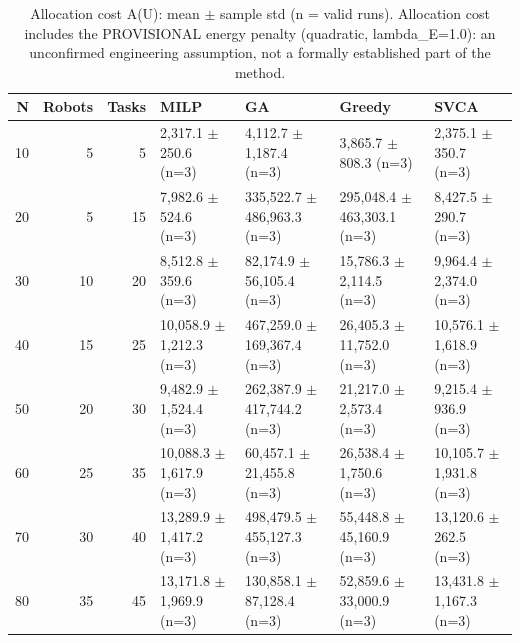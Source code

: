 \begin{table}[htbp]
\centering
\small
\caption{Allocation cost A(U): mean $\pm$ sample std (n = valid runs). Allocation cost includes the PROVISIONAL energy penalty (quadratic, lambda\_E=1.0): an unconfirmed engineering assumption, not a formally established part of the method.}
\label{tab:sample_demo_allocation_cost}
\begin{tabular}{rrrllll}
\hline
N & Robots & Tasks & MILP & GA & Greedy & SVCA \\
\hline
10 & 5 & 5 & 2,317.1 $\pm$ 250.6 (n=3) & 4,112.7 $\pm$ 1,187.4 (n=3) & 3,865.7 $\pm$ 808.3 (n=3) & 2,375.1 $\pm$ 350.7 (n=3) \\
20 & 5 & 15 & 7,982.6 $\pm$ 524.6 (n=3) & 335,522.7 $\pm$ 486,963.3 (n=3) & 295,048.4 $\pm$ 463,303.1 (n=3) & 8,427.5 $\pm$ 290.7 (n=3) \\
30 & 10 & 20 & 8,512.8 $\pm$ 359.6 (n=3) & 82,174.9 $\pm$ 56,105.4 (n=3) & 15,786.3 $\pm$ 2,114.5 (n=3) & 9,964.4 $\pm$ 2,374.0 (n=3) \\
40 & 15 & 25 & 10,058.9 $\pm$ 1,212.3 (n=3) & 467,259.0 $\pm$ 169,367.4 (n=3) & 26,405.3 $\pm$ 11,752.0 (n=3) & 10,576.1 $\pm$ 1,618.9 (n=3) \\
50 & 20 & 30 & 9,482.9 $\pm$ 1,524.4 (n=3) & 262,387.9 $\pm$ 417,744.2 (n=3) & 21,217.0 $\pm$ 2,573.4 (n=3) & 9,215.4 $\pm$ 936.9 (n=3) \\
60 & 25 & 35 & 10,088.3 $\pm$ 1,617.9 (n=3) & 60,457.1 $\pm$ 21,455.8 (n=3) & 26,538.4 $\pm$ 1,750.6 (n=3) & 10,105.7 $\pm$ 1,931.8 (n=3) \\
70 & 30 & 40 & 13,289.9 $\pm$ 1,417.2 (n=3) & 498,479.5 $\pm$ 455,127.3 (n=3) & 55,448.8 $\pm$ 45,160.9 (n=3) & 13,120.6 $\pm$ 262.5 (n=3) \\
80 & 35 & 45 & 13,171.8 $\pm$ 1,969.9 (n=3) & 130,858.1 $\pm$ 87,128.4 (n=3) & 52,859.6 $\pm$ 33,000.9 (n=3) & 13,431.8 $\pm$ 1,167.3 (n=3) \\
\hline
\end{tabular}
\end{table}

